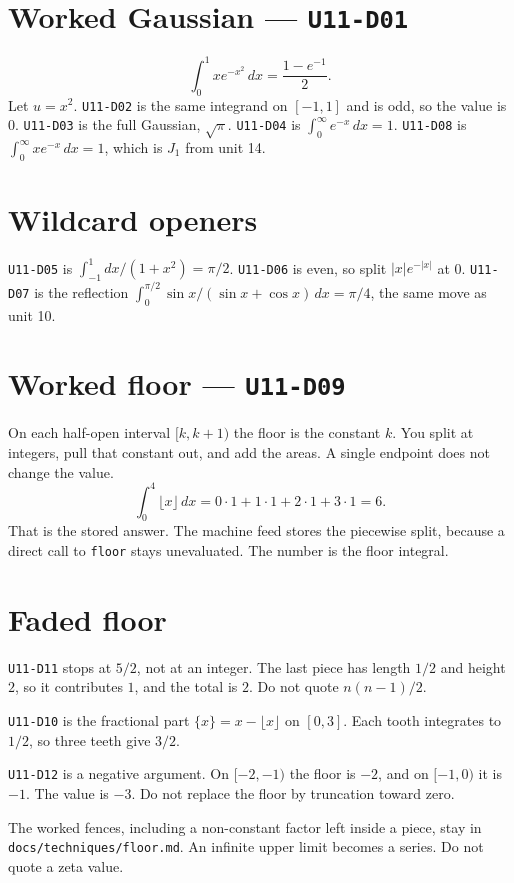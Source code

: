\section{Worked Gaussian --- \texttt{U11-D01}}
\[
\int_0^1 x e^{-x^2}\,dx=\frac{1-e^{-1}}{2}.
\]
Let $u=x^2$. \texttt{U11-D02} is the same integrand on $[-1,1]$ and is odd, so the value is 0. \texttt{U11-D03} is the full Gaussian, $\sqrt\pi$. \texttt{U11-D04} is $\int_0^{\infty}e^{-x}\,dx=1$. \texttt{U11-D08} is $\int_0^{\infty}x e^{-x}\,dx=1$, which is $J_1$ from unit 14.

\section{Wildcard openers}
\texttt{U11-D05} is $\int_{-1}^{1}dx/(1+x^2)=\pi/2$. \texttt{U11-D06} is even, so split $|x|e^{-|x|}$ at 0. \texttt{U11-D07} is the reflection $\int_0^{\pi/2}\sin x/(\sin x+\cos x)\,dx=\pi/4$, the same move as unit 10.

\section{Worked floor --- \texttt{U11-D09}}
On each half-open interval $[k,k+1)$ the floor is the constant $k$. You split at integers, pull that constant out, and add the areas. A single endpoint does not change the value.
\[
\int_0^4\lfloor x\rfloor\,dx=0\cdot 1+1\cdot 1+2\cdot 1+3\cdot 1=6.
\]
That is the stored answer. The machine feed stores the piecewise split, because a direct call to \texttt{floor} stays unevaluated. The number is the floor integral.

\section{Faded floor}
\texttt{U11-D11} stops at $5/2$, not at an integer. The last piece has length $1/2$ and height $2$, so it contributes $1$, and the total is $2$. Do not quote $n(n-1)/2$.

\texttt{U11-D10} is the fractional part $\{x\}=x-\lfloor x\rfloor$ on $[0,3]$. Each tooth integrates to $1/2$, so three teeth give $3/2$.

\texttt{U11-D12} is a negative argument. On $[-2,-1)$ the floor is $-2$, and on $[-1,0)$ it is $-1$. The value is $-3$. Do not replace the floor by truncation toward zero.

The worked fences, including a non-constant factor left inside a piece, stay in \texttt{docs/techniques/floor.md}. An infinite upper limit becomes a series. Do not quote a zeta value.

